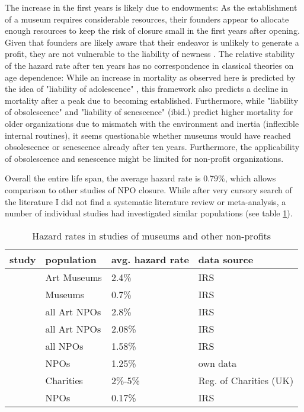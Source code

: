 \documentclass[12pt]{article}
\begin{document}
The increase in the first years is likely due to endowments: As the establishment of a museum requires considerable resources, their founders appear to allocate enough resources to keep the risk of closure small in the first years after opening.
Given that founders are likely aware that their endeavor is unlikely to generate a profit, they are not vulnerable to the liability of newness \parencite{Stinchcombe_1965_structure}.
The relative stability of the hazard rate after ten years has no correspondence in classical theories on age dependence:
While an increase in mortality as observed here is predicted by the idea of "liability of adolescence" \parencite{Carroll_Khessina_2019_demography}, this framework also predicts a decline in mortality after a peak due to becoming established.
Furthermore, while "liability of obsolescence" and "liability of senescence" (ibid.) predict higher mortality for older organizations due to mismatch with the environment and inertia (inflexible internal routines), it seems questionable whether museums would have reached obsolescence or senescence already after ten years.
Furthermore, the applicability of obsolescence and senescence might be limited for non-profit organizations.


Overall the entire life span, the average hazard rate is 0.79\%, which allows comparison to other studies of NPO closure.
While after very cursory search of the literature I did not find a systematic literature review or meta-analysis, a number of individual studies had investigated similar populations (see table \ref{tbl:litreview}).

\begin{table}[htbp]
\caption{\label{tbl:litreview}Hazard rates in studies of museums and other non-profits}
\centering
\begin{tabular}{llll}
\hline
study & population & avg. hazard rate & data source\\
\hline
\cite{Hager_2001_vulnerability} & Art Museums & 2.4\% & IRS\\
\cite{Gordon_etal_2013_insolvency} & Museums & 0.7\% & IRS\\
\hline
\cite{Hager_2001_vulnerability} & all Art NPOs & 2.8\% & IRS\\
\cite{Gordon_etal_2013_insolvency} & all Art NPOs & 2.08\% & IRS\\
\cite{Gordon_etal_2013_insolvency} & all NPOs & 1.58\% & IRS\\
\cite{Hager_Galaskiewicz_Larson_2007_liability} & NPOs & 1.25\% & own data\\
\cite{Clifford_2018_reinforcing} & Charities & 2\%-5\% & Reg. of Charities (UK)\\
\cite{Mayer_2022_slimmer} & NPOs & 0.17\% & IRS\\
\hline
\end{tabular}
\end{table}
\end{document}
